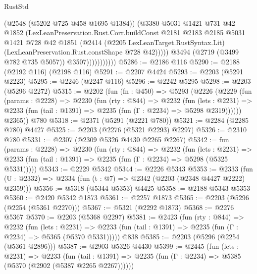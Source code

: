 \begin{lexlean}{RustStd}
\begin{coremodule}
                            (@2548 (@5202 @725 @458 @1695 @1384))
                            (@3380
                              @5031
                              @1421
                              @731
                              @42
                              @1852
                              (LexLeanPreservation.Rust.Corr.buildConst
                                @2181
                                @2183
                                @2185
                                @5031
                                @1421
                                @728
                                @42
                                @1851
                                (@2414
                                  (@2205 LexLeanTarget.RustSyntax.Lit)
                                  (LexLeanPreservation.Rust.constShape @728 @42)))))
                          @3494
                          (@2719 (@3499 @782 @735 @5057))
                          @3507)))))))))))
@5286 := @2186 @116
@5290 := @2188 (@2192 @116) (@2198 @116)
@5291 := @2207 @4424
@5293 := @2203 (@5291 @2223)
@5295 := @2246 (@2247 @116)
@5296 := @2242 @5295
@5298 := @2203 (@5296 @2272)
@5315 := @2202
    (fun (fn : @450) =>
    @5293
      (@2226
        (@2229
          (fun (params : @2228) =>
          @2230
            (fun (rty : @844) =>
            @2232
              (fun (lets : @2231) =>
              @2233 (fun (tail : @1391) => @2235 (fun (Γ : @2234) => @5298 @2319))))))
        @2365))
    @780
@5318 := @2371 (@5291 (@2221 @780))
@5321 := @2284 (@2285 @780) @4427
@5325 := @2203 (@2276 (@5321 @2293) @2297)
@5326 := @2310 @780
@5331 := @2307 (@2309 @5326 @4430 @2265 @2267)
@5342 := fun (params : @2228) =>
  @2230
    (fun (rty : @844) =>
    @2232
      (fun (lets : @2231) =>
      @2233 (fun (tail : @1391) => @2235 (fun (Γ : @2234) => @5298 (@5325 @5331)))))
@5343 := @2229 @5342
@5344 := @2226 @5343
@5353 := @2333 (fun (U : @2332) => @2334 (fun (t : @7) => @2342 (@2203 (@2348 @4427 @2222) @2359)))
@5356 := @5318 (@5344 @5353) @4425
@5358 := @2188 @5343 @5353
@5360 := @2420 @5342 @1873
@5361 := @2257 @1873
@5365 := @2203 (@5296 (@2254 (@5361 @2270)))
@5367 := @5321 (@2292 @1873)
@5368 := @2276 @5367
@5370 := @2203 (@5368 @2297)
@5381 := @2423
    (fun (rty : @844) =>
    @2232
      (fun (lets : @2231) =>
      @2233 (fun (tail : @1391) => @2235 (fun (Γ : @2234) => @5365 (@5370 @5331)))))
    @838
@5385 := @2203 (@5296 (@2254 (@5361 @2896)))
@5387 := @2903 @5326 @4430
@5399 := @2445
    (fun (lets : @2231) =>
    @2233
      (fun (tail : @1391) => @2235 (fun (Γ : @2234) => @5385 (@5370 (@2902 (@5387 @2265 @2267))))))

\end{coremodule}
\end{lexlean}
